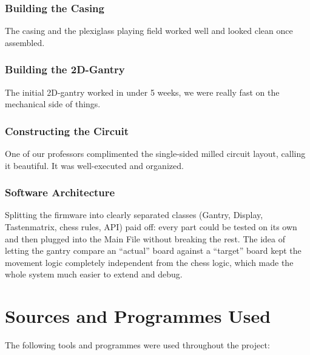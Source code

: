 \documentclass[10pt]{article}
\begin{document}
\subsubsection*{Building the Casing}
The casing and the plexiglass playing field worked well and looked clean once assembled.

\subsubsection*{Building the 2D-Gantry}
The initial 2D-gantry worked in under 5 weeks, we were really fast on the mechanical side of things.

\subsubsection*{Constructing the Circuit}
One of our professors complimented the single-sided milled circuit layout, calling it beautiful. It was well-executed and organized.

\subsubsection*{Software Architecture}
Splitting the firmware into clearly separated classes (Gantry, Display, Tastenmatrix,
chess rules, API) paid off: every part could be tested on its own and then plugged into
the Main File without breaking the rest. The idea of letting the gantry compare an
``actual'' board against a ``target'' board kept the movement logic completely
independent from the chess logic, which made the whole system much easier to extend and
debug.

\newpage

\section{Sources and Programmes Used}

The following tools and programmes were used throughout the project:
\end{document}
